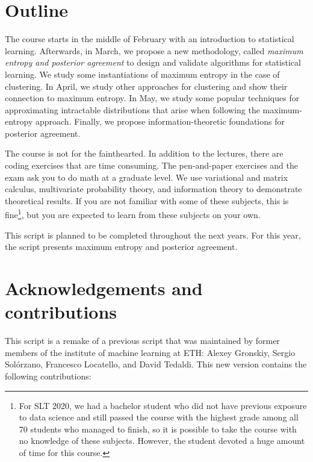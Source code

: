 \section*{Outline}

The course starts in the middle of February with an introduction to statistical
learning. Afterwards, in March, we propose a new methodology,
called \emph{maximum entropy and posterior agreement} to design and validate
algorithms for statistical learning. We study some instantiations of maximum
entropy in the case of clustering. In April, we study other approaches
for clustering and show their connection to maximum entropy. In May, we
study some popular techniques for approximating intractable distributions that arise when following the maximum-entropy approach. Finally, we propose
information-theoretic foundations for posterior agreement.

The course is not for the fainthearted. In addition to the lectures, there are coding exercises that are time consuming. The pen-and-paper exercises and the exam ask you to do math at a graduate level. We use variational and matrix calculus, multivariate probability theory, and information theory to demonstrate theoretical results. If you are not familiar with some of these subjects, this is fine\footnote{For SLT 2020, we had a bachelor student who did not have previous exposure to data science and still passed the course with the highest grade among all 70 students who managed to finish, so it is possible to take the course with no knowledge of these subjects. However, the student devoted a huge amount of time for this course.}, but you are expected to learn from these subjects on your own.

This script is planned to be completed throughout the next years. For
this year, the script presents maximum entropy and posterior
agreement.

\section*{Acknowledgements and contributions}

This script is a remake of a previous script that was maintained by former
members of the institute of machine learning at ETH: Alexey Gronskiy,
Sergio Sol\'orzano, Francesco Locatello, and David Tedaldi. This new version
contains the following contributions:

